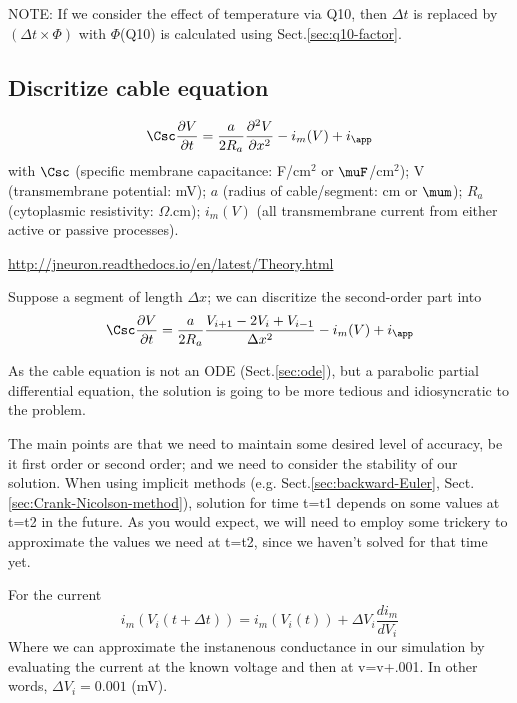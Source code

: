 NOTE: If we consider the effect of temperature via Q10, then 
$\Delta t$ is replaced by $(\Delta t \times \Phi)$ with $\Phi$(Q10) is
calculated using Sect.\ref{sec:q10-factor}.


\subsection{Discritize cable equation}
\label{sec:cable-equation-discritize}

\begin{equation}
\Csc \frac{\partial V}{\partial t} = \frac{a}{2 R_a} \frac{\partial^2
V}{\partial x^2} - i_m(V) + i_\app
\end{equation}
with $\Csc$ (specific membrane capacitance: F/cm$^2$ or $\muF$/cm$^2$); V
(transmembrane potential: mV); $a$ (radius of cable/segment: cm or $\mum$); 
$R_a$ (cytoplasmic resistivity: $\Omega.$cm); $i_m(V)$ (all transmembrane
current from either active or passive processes).

\url{http://jneuron.readthedocs.io/en/latest/Theory.html}

Suppose a segment of length $\Delta x$; we can discritize the second-order
part into
\begin{equation}
\Csc \frac{\partial V}{\partial t} = \frac{a}{2 R_a} \frac{V_{i+1} -
2 V_i + V_{i-1}}{\Delta x^2} - i_m(V) + i_\app
\end{equation}

As the cable equation is not an ODE (Sect.\ref{sec:ode}), but a parabolic
partial differential equation, the solution is going to be more tedious and
idiosyncratic to the problem.

The main points are that we need to maintain some desired level of accuracy, be
it first order or second order; and we need to consider the stability of our solution. 
When using implicit methods (e.g. Sect.\ref{sec:backward-Euler},
Sect.\ref{sec:Crank-Nicolson-method}), solution for time t=t1 depends on some
values at t=t2 in the future. As you would expect, we will need to employ some
trickery to approximate the values we need at t=t2, since we haven't solved for that time
yet.  


For the current
\begin{equation}
i_m (V_i(t+\Delta t)) = i_m (V_i(t)) + \Delta V_i \frac{di_m}{dV_i}
\end{equation}
Where we can approximate the instanenous conductance in our simulation by
evaluating the current at the known voltage and then at v=v+.001. In other
words, $\Delta V_i = 0.001$ (mV).

